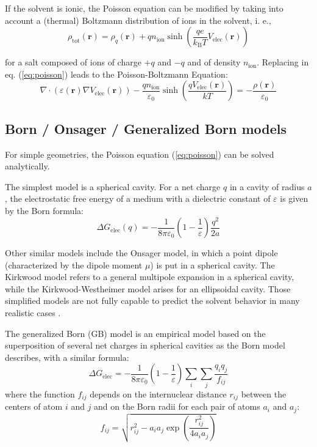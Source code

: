 If the solvent is ionic, the Poisson equation can be modified by taking
into account a (thermal) Boltzmann distribution of ions in the solvent,
i. e.,
\begin{equation}
\rho_{\mathrm{tot}}(\mathbf{r})=\rho_{q}(\mathbf{r})+qn_{\mathrm{ion}}\sinh(\frac{qe}{k_{\mathrm{B}}T}V_{\mathrm{elec}}(\mathbf{r}))
\end{equation}

for a salt composed of ions of charge $+q$ and $-q$ and of density
$n_{\mathrm{ion}}$. Replacing in eq. (\ref{eq:poisson}) leads to
the Poisson-Boltzmann Equation:
\begin{equation}
\nabla\cdot(\varepsilon(\mathbf{r})\nabla V_{\mathrm{elec}}(\mathbf{r}))-\dfrac{qn_{\mathrm{ion}}}{\varepsilon_{0}}\sinh\left(\dfrac{qV_{\mathrm{elec}}(\mathbf{r})}{kT}\right)=-\dfrac{\rho(\mathbf{r})}{\varepsilon_{0}}
\end{equation}


\subsection{Born / Onsager / Generalized Born models\label{subsec:Born-/-Onsager}}

For simple geometries, the Poisson equation (\ref{eq:poisson}) can
be solved analytically.

The simplest model is a spherical cavity. For a net charge $q$ in
a cavity of radius $a$, the electrostatic free energy of a medium
with a dielectric constant of $\varepsilon$ is given by the Born
formula:
\begin{equation}
\Delta G_{\mathrm{elec}}(q)=-\dfrac{1}{8\pi\varepsilon_{0}}\left(1-\frac{1}{\varepsilon}\right)\frac{q^{2}}{2a}
\end{equation}

Other similar models include the Onsager model, in which a point dipole
(characterized by the dipole moment $\mu$) is put in a spherical
cavity. The Kirkwood model refers to a general multipole expansion
in a spherical cavity, while the Kirkwood-Westheimer model arises
for an ellipsoidal cavity. Those simplified models are not fully capable
to predict the solvent behavior in many realistic cases \citep{Jensen}. 

The generalized Born (GB) model is an empirical model based on the
superposition of several net charges in spherical cavities as the
Born model describes, with a similar formula:
\begin{equation}
\Delta G_{\mathrm{elec}}=-\dfrac{1}{8\pi\varepsilon_{0}}\left(1-\frac{1}{\varepsilon}\right)\sum_{i}\sum_{j}\frac{q_{i}q_{j}}{f_{ij}}
\end{equation}
where the function $f_{ij}$ depends on the internuclear distance
$r_{ij}$ between the centers of atom $i$ and $j$ and on the Born
radii for each pair of atoms $a_{i}$ and $a_{j}$:
\begin{equation}
f_{ij}=\sqrt{r_{ij}^{2}-a_{i}a_{j}\exp\left(\frac{r_{ij}^{2}}{4a_{i}a_{j}}\right)}
\end{equation}

